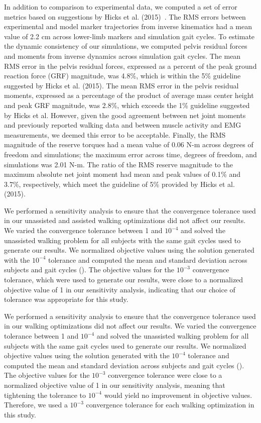 \documentclass[10pt,letterpaper]{article}
\begin{document}
In addition to comparison to experimental data, we computed a set of error metrics based on suggestions by Hicks et al. (2015)~\cite{Hicks:2015}. The RMS errors between experimental and model marker trajectories from inverse kinematics had a mean value of 2.2 cm across lower-limb markers and simulation gait cycles. To estimate the dynamic consistency of our simulations, we computed pelvis residual forces and moments from inverse dynamics across simulation gait cycles. The mean RMS error in the pelvis residual forces, expressed as a percent of the peak ground reaction force (GRF) magnitude, was 4.8\%, which is within the 5\% guideline suggested by Hicks et al. (2015). The mean RMS error in the pelvis residual moments, expressed as a percentage of the product of average mass center height and peak GRF magnitude, was 2.8\%, which exceeds the 1\% guideline suggested by Hicks et al. However, given the good agreement between  net joint moments and previously reported walking data and between muscle activity and EMG measurements, we deemed this error to be acceptable. Finally, the RMS magnitude of the reserve torques had a mean value of 0.06 N-m across degrees of freedom and simulations; the maximum error across time, degrees of freedom, and simulations was 2.01 N-m. The ratio of the RMS reserve magnitude to the maximum absolute net joint moment had mean and peak values of 0.1\% and 3.7\%, respectively, which meet the guideline of 5\% provided by Hicks et al. (2015).

We performed a sensitivity analysis to ensure that the convergence tolerance used in our unassisted and assisted walking optimizations did not affect our results. We varied the convergence tolerance between 1 and $10^{-4}$ and solved the unassisted walking problem for all subjects with the same gait cycles used to generate our results. We normalized objective values using the solution generated with the $10^{-4}$ tolerance and computed the mean and standard deviation across subjects and gait cycles (). The objective values for the $10^{-3}$ convergence tolerance, which were used to generate our results, were close to a normalized objective value of 1 in our sensitivity analysis, indicating that our choice of tolerance was appropriate for this study.

We performed a sensitivity analysis to ensure that the convergence tolerance used in our walking optimizations did not affect our results. We varied the convergence tolerance between 1 and $10^{-4}$ and solved the unassisted walking problem for all subjects with the same gait cycles used to generate our results. We normalized objective values using the solution generated with the $10^{-4}$ tolerance and computed the mean and standard deviation across subjects and gait cycles (). The objective values for the $10^{-3}$ convergence tolerance were close to a normalized objective value of 1 in our sensitivity analysis, meaning that tightening the tolerance to $10^{-4}$ would yield no improvement in objective values. Therefore, we used a $10^{-3}$ convergence tolerance for each walking optimization in this study.
\end{document}
